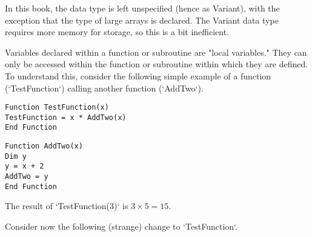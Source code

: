 In this book, the data type is left unspecified (hence as Variant), with
the exception that the type of large arrays is declared. The Variant
data type requires more memory for storage, so this is a bit
inefficient.


Variables declared within a function or subroutine are "local
variables." They can only be accessed within the function or subroutine
within which they are defined. To understand this, consider the
following simple example of a function (`TestFunction`) calling another
function (`AddTwo`).

\small\begin{verbatim}
Function TestFunction(x)
TestFunction = x * AddTwo(x)
End Function
\end{verbatim}\normalsize

\small\begin{verbatim}
Function AddTwo(x)
Dim y
y = x + 2
AddTwo = y
End Function
\end{verbatim}\normalsize
The result of `TestFunction(3)` is $3 \times 5 = 15$.

Consider now the following (strange) change to `TestFunction`.

